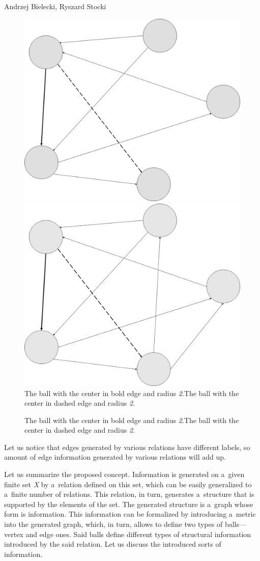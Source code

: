 \begin{artengenv2auth}{Andrzej Bielecki, Ryszard Stocki}
\begin{figure}
 \begin{center}
 \includegraphics[width=.5\textwidth]{ART_Bielecki/InfoStructcorrectedcopyeditedPP-img004.png}%
 \includegraphics[width=.5\textwidth]{ART_Bielecki/InfoStructcorrectedcopyeditedPP-img005.png}%
 The ball with the center in bold edge and radius \textit{2}.The ball with the center in dashed edge and radius \textit{2.}
 \end{center}%
 \caption{The ball with the center in bold edge and radius \textit{2}.The ball with the center in dashed edge and radius \textit{2.}}\label{bie:fig3}
\end{figure}





Let us notice that edges generated by various relations have different labels, so amount of edge information generated by various relations will add up.



Let us summarize the proposed concept. Information is generated on a~given finite set \textit{X} by a~relation defined on this set, which can be easily generalized to a~finite number of relations. This relation, in turn, generates a~structure that is supported by the elements of the set. The generated structure is a~graph whose form is information. This information can be formalized by introducing a~metric into the generated graph, which, in turn, allows to define two types of balls---vertex and edge ones. Said balls define different types of structural information introduced by the said relation. Let us discuss the introduced sorts of information.




\end{artengenv2auth}
